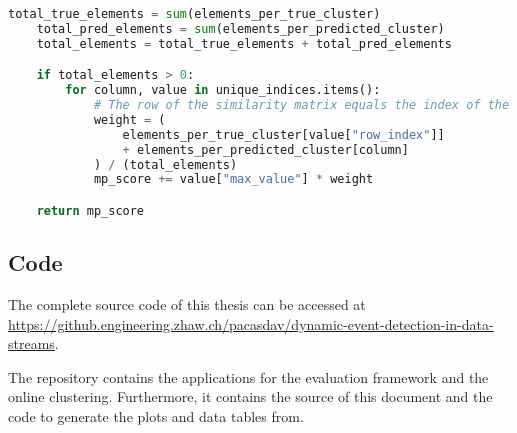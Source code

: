 \begin{lstlisting}[language=Python, caption=Calculate the MP-Score between two clusterings., label={lst:select_max_values}]
    total_true_elements = sum(elements_per_true_cluster)
    total_pred_elements = sum(elements_per_predicted_cluster)
    total_elements = total_true_elements + total_pred_elements

    if total_elements > 0:
        for column, value in unique_indices.items():
            # The row of the similarity matrix equals the index of the true cluster, while the column is the index of the predicted cluster
            weight = (
                elements_per_true_cluster[value["row_index"]]
                + elements_per_predicted_cluster[column]
            ) / (total_elements)
            mp_score += value["max_value"] * weight

    return mp_score
\end{lstlisting}

\subsection{Code}

The complete source code of this thesis can be accessed at\\
\underline{https://github.engineering.zhaw.ch/pacasdav/dynamic-event-detection-in-data-streams}.

The repository contains the applications for the evaluation framework and the online clustering.
Furthermore, it contains the source of this document and the code to generate the plots and data tables from.
